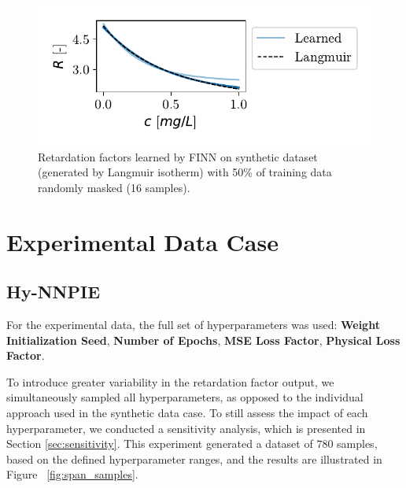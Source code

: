 \begin{figure}[h]
    \centering
    \includegraphics{figs/finn_synthetic_SPAN_losspattern.pdf}
    \caption{Retardation factors learned by FINN on synthetic dataset (generated by Langmuir isotherm) with 50\% of training data randomly masked (16 samples).}
    \label{fig:synthetic_SPAN_losspattern}
\end{figure}






\section{Experimental Data Case}

\subsection{Hy-NNPIE}
For the experimental data, the full set of hyperparameters was used: \textbf{Weight Initialization Seed}, \textbf{Number of Epochs}, \textbf{MSE Loss Factor}, \textbf{Physical Loss Factor}.

To introduce greater variability in the retardation factor output, we simultaneously sampled all hyperparameters, as opposed to the individual approach used in the synthetic data case. To still assess the impact of each hyperparameter, we conducted a sensitivity analysis, which is presented in Section \vref{sec:sensitivity}. This experiment generated a dataset of $780$ samples, based on the defined hyperparameter ranges, and the results are illustrated in Figure ~\vref{fig:span_samples}.

